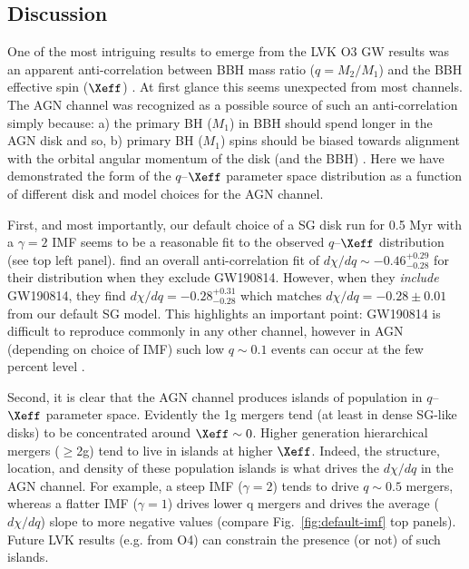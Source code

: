 \subsection{Discussion}
\label{sec:discussion-ch2}
One of the most intriguing results to emerge from the LVK O3 GW results was an apparent anti-correlation between BBH mass ratio ($q=M_{2}/M_{1}$) and the BBH effective spin ($\Xeff$) \citep{Callister+21}.
At first glance this seems unexpected from most channels.
The AGN channel was recognized as a possible source of such an anti-correlation simply because: a) the primary BH ($M_{1}$) in BBH should spend longer in the AGN disk and so, b) primary BH ($M_{1}$) spins should be biased towards alignment with the orbital angular momentum of the disk (and the BBH) \citep[e.g.][]{Mckernan+22:q-Xeff,Santini+23, DittmannDempseyLi24}.
Here we have demonstrated the form of the $q$--$\Xeff$ parameter space distribution as a function of different disk and model choices for the AGN channel.

First, and most importantly, our default choice of a SG disk run for 0.5 Myr with a $\gamma=2$ IMF seems to be a reasonable fit to the observed $q$--$\Xeff$ distribution (see  top left panel).
\citet{Callister+21} find an overall anti-correlation fit of $d\chi/dq \sim -0.46^{+0.29}_{-0.28}$ for their distribution when they exclude GW190814.
However, when they \emph{include} GW190814, they find $d\chi/dq=-0.28^{+0.31}_{-0.28}$ which matches $d\chi/dq=-0.28\pm0.01$ from our default SG model.
This highlights an important point: GW190814 is difficult to reproduce commonly in any other channel, however in AGN (depending on choice of IMF) such low $q \sim 0.1$ events can occur at the few percent level \citep{Secunda+19, McKernan+20b,TagawaHaimanKocsis20}.

Second, it is clear that the AGN channel produces islands of population in $q$--$\Xeff$ parameter space.
Evidently the 1g mergers tend (at least in dense SG-like disks) to be concentrated around $\Xeff \sim 0$.
Higher generation hierarchical mergers ($\geq$2g) tend to live in islands at higher $\Xeff$.
Indeed, the structure, location, and density of these population islands is what drives the $d\chi/dq$ in the AGN channel.
For example, a steep IMF ($\gamma=2$) tends to drive $q \sim 0.5$ mergers, whereas a flatter IMF ($\gamma=1$) drives lower q mergers and drives the average ($d\chi/dq$) slope to more negative values (compare Fig.~\ref{fig:default-imf} top panels).
Future LVK results (e.g.
from O4) can constrain the presence (or not) of such islands.

